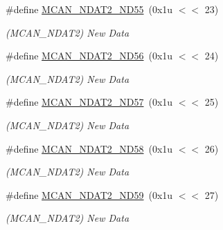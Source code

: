 \begin{DoxyCompactItemize}
\mbox{\label{group__SAME70__MCAN_ga3258bd227dd7d072d0cde766656534c2}} 
\#define \mbox{\hyperlink{group__SAME70__MCAN_ga3258bd227dd7d072d0cde766656534c2}{M\+C\+A\+N\+\_\+\+N\+D\+A\+T2\+\_\+\+N\+D55}}~(0x1u $<$$<$ 23)
\begin{DoxyCompactList}\small\item\em (M\+C\+A\+N\+\_\+\+N\+D\+A\+T2) New Data \end{DoxyCompactList}\item 
\mbox{\label{group__SAME70__MCAN_ga28bc1d75f8b7c4cebd081657b7fe5499}} 
\#define \mbox{\hyperlink{group__SAME70__MCAN_ga28bc1d75f8b7c4cebd081657b7fe5499}{M\+C\+A\+N\+\_\+\+N\+D\+A\+T2\+\_\+\+N\+D56}}~(0x1u $<$$<$ 24)
\begin{DoxyCompactList}\small\item\em (M\+C\+A\+N\+\_\+\+N\+D\+A\+T2) New Data \end{DoxyCompactList}\item 
\mbox{\label{group__SAME70__MCAN_gaf7a786e7ed6e37241bfbde80d418d5f1}} 
\#define \mbox{\hyperlink{group__SAME70__MCAN_gaf7a786e7ed6e37241bfbde80d418d5f1}{M\+C\+A\+N\+\_\+\+N\+D\+A\+T2\+\_\+\+N\+D57}}~(0x1u $<$$<$ 25)
\begin{DoxyCompactList}\small\item\em (M\+C\+A\+N\+\_\+\+N\+D\+A\+T2) New Data \end{DoxyCompactList}\item 
\mbox{\label{group__SAME70__MCAN_gaa4ddafce252001f260b5047484e7acbb}} 
\#define \mbox{\hyperlink{group__SAME70__MCAN_gaa4ddafce252001f260b5047484e7acbb}{M\+C\+A\+N\+\_\+\+N\+D\+A\+T2\+\_\+\+N\+D58}}~(0x1u $<$$<$ 26)
\begin{DoxyCompactList}\small\item\em (M\+C\+A\+N\+\_\+\+N\+D\+A\+T2) New Data \end{DoxyCompactList}\item 
\mbox{\label{group__SAME70__MCAN_gab9b3c37aedbab630c20e6de8e989a98a}} 
\#define \mbox{\hyperlink{group__SAME70__MCAN_gab9b3c37aedbab630c20e6de8e989a98a}{M\+C\+A\+N\+\_\+\+N\+D\+A\+T2\+\_\+\+N\+D59}}~(0x1u $<$$<$ 27)
\begin{DoxyCompactList}\small\item\em (M\+C\+A\+N\+\_\+\+N\+D\+A\+T2) New Data \end{DoxyCompactList}\item 
$$
\end{DoxyCompactItemize}
